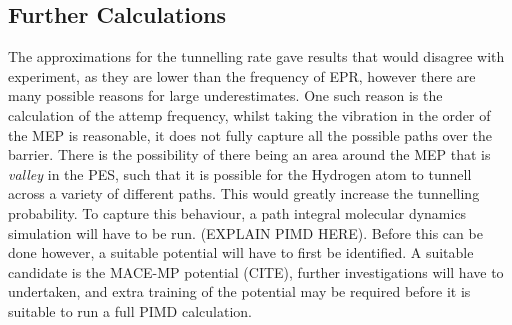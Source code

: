 \documentclass[10pt,a4paper,twocolumn,twoside]{extarticle}
\begin{document}
\subsection{Further Calculations}
The approximations for the tunnelling rate gave results that would disagree with experiment, as they are lower than the frequency of EPR, however there are many possible reasons for large underestimates. One such reason is the calculation of the attemp frequency, whilst taking the vibration in the order of the MEP is reasonable, it does not fully capture all the possible paths over the barrier. There is the possibility of there being an area around the MEP that is \emph{valley} in the PES, such that it is possible for the Hydrogen atom to tunnell across a variety of different paths. This would greatly increase the tunnelling probability. To capture this behaviour, a path integral molecular dynamics simulation will have to be run. (EXPLAIN PIMD HERE). Before this can be done however, a suitable potential will have to first be identified. A suitable candidate is the MACE-MP potential (CITE), further investigations will have to undertaken, and extra training of the potential may be required before it is suitable to run a full PIMD calculation.

\end{document}
